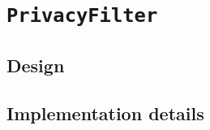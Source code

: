\section{\texttt{PrivacyFilter}}
\label{Implementation:PrivacyFilter}

\subsection{Design}
\label{Implementation:PrivacyFilter:Design}

\subsection{Implementation details}
\label{Implementation:PrivacyFilter:Details}
